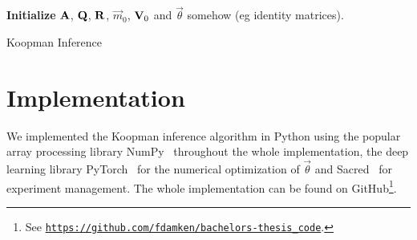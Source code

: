 	\begin{algorithm}  \DontPrintSemicolon
		\textbf{Initialize} \(\boldsymbol{\mathrm{A}}\), \(\boldsymbol{\mathrm{Q}}\), \(\boldsymbol{\mathrm{R}}\), \(\vec{m}_0\), \(\boldsymbol{\mathrm{V}}_0\) and \(\vec{\theta}\) somehow (\ac{eg} identity matrices). \;
		\caption{Koopman Inference}
		\label{alg:ngk}
	\end{algorithm}

\section{Implementation}
	\label{sec:implementation}

	We implemented the Koopman inference algorithm in Python using the popular array processing library NumPy~\cite{harrisArrayProgrammingNumPy2020} throughout the whole implementation, the deep learning library PyTorch~\cite{paszkePyTorchImperativeStyle2019} for the numerical optimization of \(\vec{\theta}\) and Sacred~\cite{greffSacredInfrastructureComputational2017} for experiment management. The whole implementation can be found on GitHub\footnote{See \href{https://github.com/fdamken/bachelors-thesis_code}{\texttt{https://github.com/fdamken/bachelors-thesis\_code}}.}.

